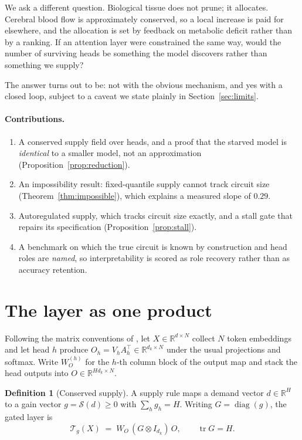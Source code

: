 \documentclass[10pt,twocolumn]{article}
\theoremstyle{plain}
\theoremstyle{definition}
\newtheorem{definition}{Definition}
\theoremstyle{remark}
\begin{document}
We ask a different question. Biological tissue does not prune; it allocates. Cerebral
blood flow is approximately conserved, so a local increase is paid for elsewhere, and the
allocation is set by feedback on metabolic deficit rather than by a ranking. If an
attention layer were constrained the same way, would the number of surviving heads be
something the model discovers rather than something we supply?

The answer turns out to be: not with the obvious mechanism, and yes with a closed loop,
subject to a caveat we state plainly in Section~\ref{sec:limits}.

\paragraph{Contributions.}
\begin{enumerate}\itemsep0pt
  \item A conserved supply field over heads, and a proof that the starved model is
        \emph{identical} to a smaller model, not an approximation
        (Proposition~\ref{prop:reduction}).
  \item An impossibility result: fixed-quantile supply cannot track circuit size
        (Theorem~\ref{thm:impossible}), which explains a measured slope of $0.29$.
  \item Autoregulated supply, which tracks circuit size exactly, and a stall gate that
        repairs its specification (Proposition~\ref{prop:stall}).
  \item A benchmark on which the true circuit is known by construction and head roles are
        \emph{named}, so interpretability is scored as role recovery rather than as
        accuracy retention.
\end{enumerate}

\section{The layer as one product}

Following the matrix conventions of \cite{kozachkov2023}, let
$X \in \mathbb{R}^{d \times N}$ collect $N$ token embeddings and let head $h$ produce
$O_h = V_h A_h^{\top} \in \mathbb{R}^{d_k \times N}$ under the usual projections and
softmax. Write $W_O^{(h)}$ for the $h$-th column block of the output map and stack the
head outputs into $O \in \mathbb{R}^{H d_k \times N}$.

\begin{definition}[Conserved supply]
\label{def:supply}
A supply rule maps a demand vector $d \in \mathbb{R}^H$ to a gain vector
$g = \mathcal{S}(d) \ge 0$ with $\sum_h g_h = H$. Writing
$G = \operatorname{diag}(g)$, the gated layer is
\begin{equation}
  \label{eq:kron}
  \mathcal{T}_g(X) \;=\; W_O\,(G \otimes I_{d_k})\,O,
  \qquad \operatorname{tr} G = H .
\end{equation}
\end{definition}
\end{document}
